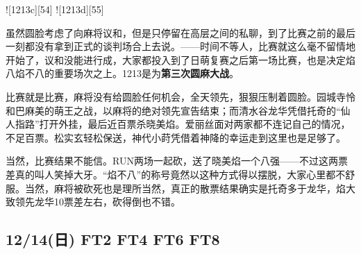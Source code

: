 ![1213c][54]
![1213d][55]

虽然圆脸考虑了向麻将议和，但是只停留在高层之间的私聊，到了比赛之前的最后一刻都没有拿到正式的谈判场合上去说。——时间不等人，比赛就这么毫不留情地开始了，议和没能进行成，大家都投入到了日萌复赛之后第一场比赛，也是决定焰八焰不八的重要场次之上。1213是为\textbf{第三次圆麻大战}。

比赛就是比赛，麻将没有给圆脸任何机会，全天领先，狠狠压制着圆脸。园城寺怜和巴麻美的萌王之战，以麻将的绝对领先宣告结束；而清水谷龙华凭借托奇的“仙人指路”打开外挂，最后近百票杀晓美焰。爱丽丝面对两家都不连记自己的情况，不足百票。松实玄轻松保送，神代小莳凭借着神降的幸运走到这里也是足够了。

当然，比赛结果不能信。RUN两场一起砍，送了晓美焰一个八强——不过这两票差真的叫人笑掉大牙。“焰不八”的称号竟然以这种方式得以摆脱，大家心里都不舒服。当然，麻将被砍死也是理所当然，真正的散票结果确实是托奇多于龙华，焰大致领先龙华10票差左右，砍得倒也不错。

\subsection{12/14(日) FT2 FT4 FT6 FT8}

